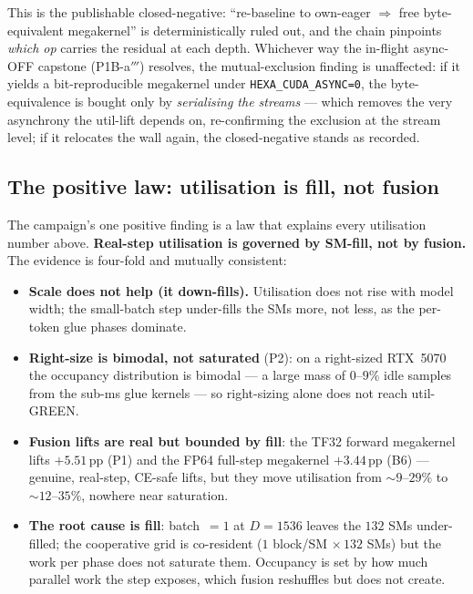 \documentclass[11pt,a4paper]{article}
\begin{document}
\noindent This is the publishable closed-negative: ``re-baseline to
own-eager $\Rightarrow$ free byte-equivalent megakernel'' is
deterministically ruled out, and the chain pinpoints \emph{which op} carries
the residual at each depth. Whichever way the in-flight async-OFF capstone
(P1B-a$'''$) resolves, the mutual-exclusion finding is unaffected: if it
yields a bit-reproducible megakernel under \texttt{HEXA\_CUDA\_ASYNC=0}, the
byte-equivalence is bought only by \emph{serialising the streams} --- which
removes the very asynchrony the util-lift depends on, re-confirming the
exclusion at the stream level; if it relocates the wall again, the
closed-negative stands as recorded.

\subsection{The positive law: utilisation is fill, not fusion}
\label{sec:fill}

The campaign's one positive finding is a law that explains every utilisation
number above. \textbf{Real-step utilisation is governed by SM-fill, not by
fusion.} The evidence is four-fold and mutually consistent:

\begin{itemize}\itemsep0.3em
\item \textbf{Scale does not help (it down-fills).} Utilisation does not rise
with model width; the small-batch step under-fills the SMs more, not less,
as the per-token glue phases dominate.
\item \textbf{Right-size is bimodal, not saturated} (P2): on a right-sized
RTX~5070 the occupancy distribution is bimodal --- a large mass of
$0$--$9\%$ idle samples from the sub-ms glue kernels --- so right-sizing
alone does not reach util-GREEN.
\item \textbf{Fusion lifts are real but bounded by fill}: the TF32 forward
megakernel lifts $+5.51$\,pp (P1) and the FP64 full-step megakernel
$+3.44$\,pp (B6) --- genuine, real-step, CE-safe lifts, but they move
utilisation from ${\sim}9$--$29\%$ to ${\sim}12$--$35\%$, nowhere near
saturation.
\item \textbf{The root cause is fill}: batch~$=1$ at $D{=}1536$ leaves the
$132$ SMs under-filled; the cooperative grid is co-resident
($1$ block/SM $\times\,132$ SMs) but the work per phase does not saturate
them. Occupancy is set by how much parallel work the step exposes, which
fusion reshuffles but does not create.
\end{itemize}
\end{document}

